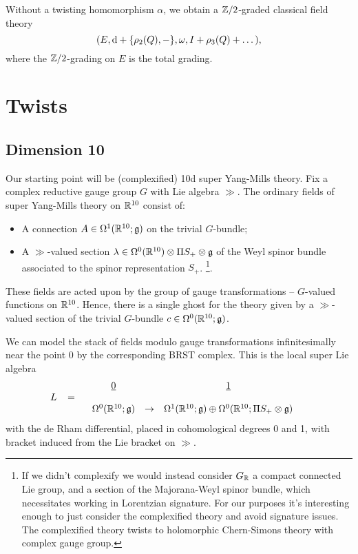 \documentclass[10pt, oneside]{article}
\begin{document}
\begin{remark}
Without a twisting homomorphism $\alpha$, we obtain a $\mathbb Z/2$-graded classical field theory
\[(E, {\rm d} + \{\rho_2(Q), -\}, \omega, I + \rho_3(Q) + \dots),\]
where the $\mathbb Z/2$-grading on $E$ is the total grading.
\end{remark}

\section{Twists}

\subsection{Dimension 10}

Our starting point will be (complexified) 10d super Yang-Mills theory. Fix a complex reductive gauge group $G$ with Lie algebra $\gg$.  
The ordinary fields of super Yang-Mills theory on $\mathbb R^{10}$ consist of:
\begin{itemize}
\item A connection $A \in \Omega^1(\mathbb R^{10} ; \mathfrak g)$ on the trivial $G$-bundle;
\item A $\gg$-valued section $\lambda \in \Omega^0(\mathbb R^{10}) \otimes \Pi S_+ \otimes \mathfrak g$ of the Weyl spinor bundle associated to the spinor representation $S_+$. 
\footnote{If we didn't complexify we would instead consider $G_\mathbb R$ a compact connected Lie group, and a section of the Majorana-Weyl spinor bundle, which necessitates working in Lorentzian signature.  For our purposes it's interesting enough to just consider the complexified theory and avoid signature issues.  The complexified theory twists to holomorphic Chern-Simons theory with complex gauge group.}.  
\end{itemize}
These fields are acted upon by the group of gauge transformations -- $G$-valued functions on $\mathbb R^{10}$. 
Hence, there is a single ghost for the theory given by a $\gg$-valued section of the trivial $G$-bundle $c \in \Omega^0(\mathbb R^{10} ; \mathfrak g)$. 

We can model the stack of fields modulo gauge transformations infinitesimally near the point $0$ by the corresponding BRST complex.  This is the local super Lie algebra
\[
L \;\;\; = \begin{array}{ccccc}
& \underline{0} & & \underline{1} & \\ 
& & & & \\
& \Omega^0(\mathbb R^{10}; \mathfrak{g}) & \to & \Omega^1(\mathbb R^{10}; \mathfrak{g}) \oplus \Omega^0(\mathbb R^{10}; \Pi S_+ \otimes \mathfrak{g}) & 
\end{array}
\]
with the de Rham differential, placed in cohomological degrees 0 and 1, with bracket induced from the Lie bracket on $\gg$.
\end{document}
